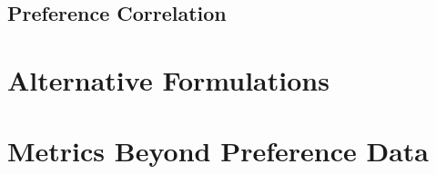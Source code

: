 \documentclass{article}
\begin{document}








\subsection{Preference Correlation}



\section{Alternative Formulations}



\section{Metrics Beyond Preference Data}
\label{Beyond}






\nocite{*}


\end{document}
